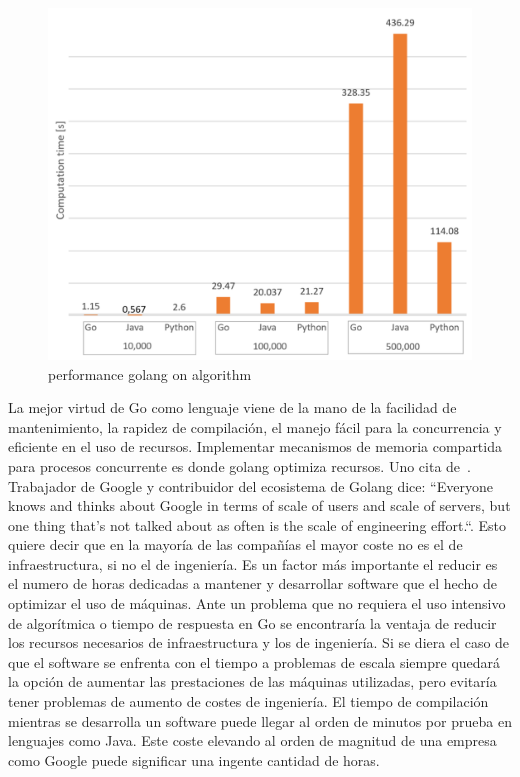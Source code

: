 \begin{figure}[H]
	\includegraphics[height=0.3\textheight]{./part/Proyecto_ejecutivo/memoria_constructiva/golang/img/compTime}
	\caption[Estudio comparativo de rendimiento de Go, Python y Java]{performance golang on algorithm\cite{Dymora20201}}\label{fig:performance golang}
\end{figure}

La mejor virtud de Go como lenguaje viene de la mano de la facilidad de mantenimiento, la rapidez de compilación, el manejo fácil para la concurrencia y eficiente en el uso de recursos.
Implementar mecanismos de memoria compartida para procesos concurrente es donde golang optimiza recursos.
Uno cita de~\cite{Meyerson2014104+101}.
Trabajador de Google y contribuidor del ecosistema de Golang dice:
“Everyone knows and thinks about Google in terms of scale of users and scale of servers, but one thing that's not talked about as often is the scale of engineering effort.“.
Esto quiere decir que en la mayoría de las compañías el mayor coste no es el de infraestructura, si no el de ingeniería.
Es un factor más importante el reducir es el numero de horas dedicadas a mantener y desarrollar software que el hecho de optimizar el uso de máquinas.
Ante un problema que no requiera el uso intensivo de algorítmica o tiempo de respuesta en Go se encontraría la ventaja de reducir los recursos necesarios de infraestructura y los de ingeniería.
Si se diera el caso de que el software se enfrenta con el tiempo a problemas de escala siempre quedará la opción de aumentar las prestaciones de las máquinas utilizadas, pero evitaría tener problemas de aumento de costes de ingeniería.
El tiempo de compilación mientras se desarrolla un software puede llegar al orden de minutos por prueba en lenguajes como Java.
Este coste elevando al orden de magnitud de una empresa como Google puede significar una ingente cantidad de horas.

